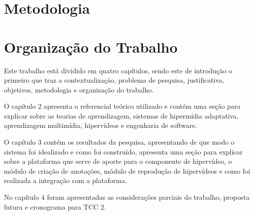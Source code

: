\section{Metodologia}



\section{Organização do Trabalho}

Este trabalho está dividido em quatro capítulos, sendo este de introdução o primeiro que traz a contextualização, problema de pesquisa, justificativa, objetivos, metodologia e organização do trabalho.

O capítulo 2 apresenta o referencial teórico utilizado e contém uma seção para explicar sobre as teorias de aprendizagem, sistemas de hipermídia adaptativa, aprendizagem multimídia, hipervídeos e engenharia de software.

O capítulo 3 contém os resultados da pesquisa, apresentando de que modo o sistema foi idealizado e como foi construído, apresenta uma seção para explicar sobre a plataforma que serve de aporte para o componente de hipervídeo, o módulo de criação de anotações, módulo de reprodução de hipervídeos e como foi realizada a integração com a plataforma.

No capítulo 4 foram apresentadas as considerações parciais do trabalho, proposta futura e cronograma para TCC 2.